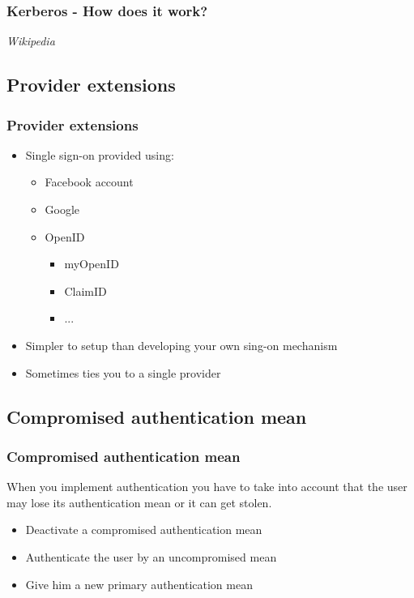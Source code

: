 \begin{frame}
\frametitle{Kerberos - How does it work?}
\textit{Wikipedia}
\end{frame}

\subsection{Provider extensions}

\begin{frame}
\frametitle{Provider extensions}
\begin{itemize}
\item Single sign-on provided using:
	\begin{itemize}
	\item Facebook account
	\item Google
	\item OpenID
		\begin{itemize}
		\item myOpenID
		\item ClaimID
		\item ...
		\end{itemize}
	\end{itemize}
\item Simpler to setup than developing your own sing-on mechanism
\item Sometimes ties you to a single provider
\end{itemize}
\end{frame}

\subsection{Compromised authentication mean}

\begin{frame}
\frametitle{Compromised authentication mean}
When you implement authentication you have to take into account that
the user may lose its authentication mean or it can get stolen.
\begin{itemize}
\item Deactivate a compromised authentication mean
\item Authenticate the user by an uncompromised mean
\item Give him a new primary authentication mean
\end{itemize}
\end{frame}

